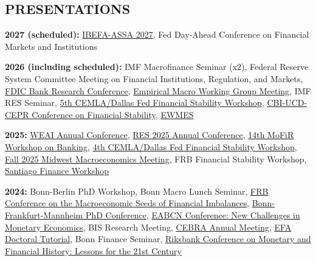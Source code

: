 \documentclass{res}
\begin{document}
\begin{resume}
\section{PRESENTATIONS}
\vspace{0.05in}
    \textbf{2027 (scheduled):} 
    \href{https://www.aeaweb.org/conference/2027/preliminary/1841}{IBEFA-ASSA 2027},
    Fed Day-Ahead Conference on Financial Markets and Institutions

    \textbf{2026 (including scheduled):} 
    IMF Macrofinance Seminar (x2), 
    Federal Reserve System Committee Meeting on Financial Institutions, Regulation, and Markets,
    \href{https://www.fdic.gov/center-financial-research/25th-annual-bank-research-conference}{FDIC Bank Research Conference},
    \href{https://utexas.box.com/shared/static/46c5cvu60bih83ixlm0sd4oyfhehdz6b.pdf}{Empirical Macro Working Group Meeting},
    IMF RES Seminar, 
    \href{https://www.cemla.org/actividades/2026/2026-11-5th-cemla-dallas-fed-workshop.html}{5th CEMLA/Dallas Fed Financial Stability Workshop},
    \href{https://cepr.org/events/central-bank-ireland-ucd-cepr-conference-macro-finance-and-financial-stability-policies-2026}{CBI-UCD-CEPR Conference on Financial Stability},
    \href{https://www.econometricsociety.org/regional-activities/schedule/2026/12/02/2026-European-Winter-Meeting-Warsaw-Poland}{EWMES}

    \textbf{2025:} 
    \href{https://www.weai.org/events/100th-annual-conference}{WEAI Annual Conference},
    \href{https://res.org.uk/event-listing/res-2025-annual-conference/}{RES 2025 Annual Conference},
    \href{https://cepr.org/events/14th-mofir-workshop-banking}{14th MoFiR Workshop on Banking},
    \href{https://www.cemla.org/actividades/2025/2025-11-iv-cemla-dallas-fed-workshop.html}{4th CEMLA/Dallas Fed Financial Stability Workshop},
    \href{https://www.clevelandfed.org/events/2025/ev-20251113-midwest-macroeconomics-meeting}{Fall 2025 Midwest Macroeconomics Meeting},
    FRB Financial Stability Workshop,
    \href{https://sfw.unegocios.cl/wp-content/uploads/2025/12/Program_SFW_2025_9_10.pdf}{Santiago Finance Workshop}
    
    \textbf{2024:}
    Bonn-Berlin PhD Workshop, 
    Bonn Macro Lunch Seminar,
    \href{https://www.federalreserve.gov/conferences/frb-conference-on-the-macroeconomic-seeds-of-financial-imbalances-20240509.htm}{FRB Conference on the Macroeconomic Seeds of Financial Imbalances}, 
    \href{https://sites.google.com/view/bcfm-phd-conference/past-conferences/2024-2nd-conference}{Bonn-Frankfurt-Mannheim PhD Conference},
    \href{https://cepr.org/events/eabcn-conference-new-challenges-monetary-economics}{EABCN Conference: New Challenges in Monetary Economics},
    BIS Research Meeting,
    \href{https://www.cebra-events.org/summary-program}{CEBRA Annual Meeting},
    \href{https://efa2024.efa-finance.org/program/efa-doctoral-tutorial/}{EFA Doctoral Tutorial},
    Bonn Finance Seminar,
    \href{https://www.riksbank.se/en-gb/press-and-published/conferences/2024/monetary-and-financial-history-lessons-for-the-21st-century/}{Riksbank Conference on Monetary and Financial History: Lessons for the 21st Century}
    

\end{resume}
\end{document}
